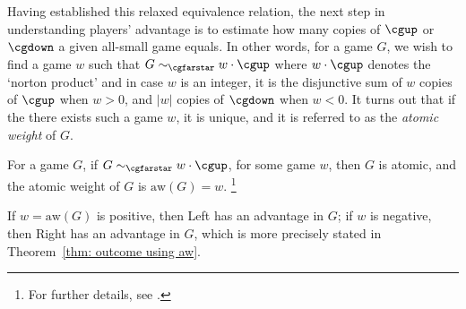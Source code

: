 \documentclass[oneside,reqno]{amsart}
\newcommand{\aw}{\mathrm{aw}}
\newcommand{\cgfarstareq}[2]{{#1}\sim_{\cgfarstar}{#2}}
\begin{document}
    Having established this relaxed equivalence relation, the next step in understanding players' advantage is to estimate how many copies of $\cgup$ or $\cgdown$ a given all-small game equals. In other words, for a game $G$, we wish to find a game $w$ such that $\cgfarstareq{G}{w \cdot \cgup}$ where $w \cdot \cgup$ denotes the `norton product' and in case $w$ is an integer, it is the disjunctive sum of $w$ copies of $\cgup$ when $w > 0$, and $|w|$ copies of $\cgdown$ when $w < 0$. It turns out that if the there exists such a  game $w$, it is unique, and it is referred to as the \emph{atomic weight} of $G$.


    \begin{definition}\label{def: atomic weight}
        For a game $G$, if $\cgfarstareq{G}{w\cdot\cgup}$, for some game $w$, then $G$ is atomic, and the atomic weight of $G$ is  $\aw(G)=w$. \footnote{For further details, see \cites{LiP,S2013}.}
    \end{definition}
    
    If $w = \aw(G)$ is positive, then Left has an advantage in $G$; if $w$ is negative, then Right has an advantage in $G$, which is more precisely stated in Theorem~\ref{thm: outcome using aw}.

    
\end{document}

